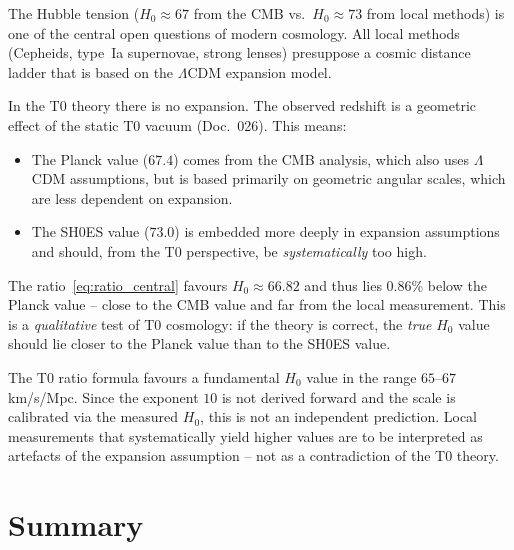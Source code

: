 The Hubble tension ($H_0 \approx 67$ from the CMB vs.\ $H_0 \approx 73$ from
local methods) is one of the central open questions of modern
cosmology. All local methods (Cepheids, type~Ia supernovae,
strong lenses) presuppose a cosmic distance ladder that is
based on the $\Lambda$CDM expansion model.

In the T0 theory there is no expansion. The observed
redshift is a geometric effect of the static
T0 vacuum (Doc.~026). This means:

\begin{itemize}
    \item The Planck value ($67.4$) comes from the CMB analysis, which
          also uses $\Lambda$CDM assumptions, but is based
          primarily on geometric angular scales, which are
          less dependent on expansion.
    \item The SH0ES value ($73.0$) is embedded more deeply in
          expansion assumptions and should, from the T0 perspective, be
          \emph{systematically} too high.
\end{itemize}

The ratio~\eqref{eq:ratio_central} favours $H_0 \approx 66.82$
and thus lies 0.86\% below the Planck value -- close to the CMB value and far
from the local measurement.
This is a \emph{qualitative} test of T0 cosmology: if the theory
is correct, the \emph{true} $H_0$ value should lie closer to the Planck value than to the
SH0ES value.

\begin{keyresult}
    The T0 ratio formula favours a fundamental $H_0$ value
    in the range $65$--$67$ km/s/Mpc. Since the exponent $10$ is not
    derived forward and the scale is calibrated via the measured $H_0$,
    this is not an independent prediction. Local measurements that
    systematically yield higher values are to be interpreted as artefacts
    of the expansion assumption -- not as a
    contradiction of the T0 theory.
\end{keyresult}

\section{Summary}
\label{sec:zusammenfassung}

